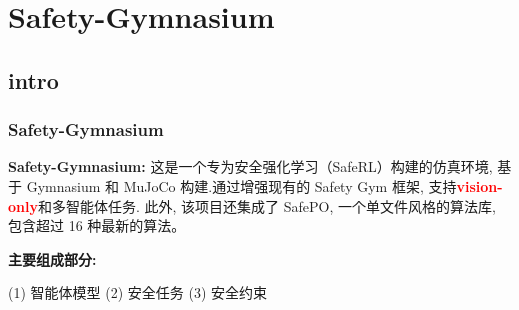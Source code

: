 \documentclass[10pt,mathserif]{beamer}%
\begin{document}
\section{Safety-Gymnasium}

\subsection{intro}

\begin{frame}[t, fragile]
\frametitle{Safety-Gymnasium}

\begin{minipage}[t]{\textwidth}
   \textbf{Safety-Gymnasium:} 这是一个专为安全强化学习（SafeRL）构建的仿真环境, 基于 Gymnasium 和 MuJoCo 构建.通过增强现有的 Safety Gym 框架, 支持\textbf{\textcolor{red}{vision-only}}和多智能体任务. 此外, 该项目还集成了 SafePO, 一个单文件风格的算法库, 包含超过 16 种最新的算法。
   
   \vspace{0.3cm}
   
   \textbf{主要组成部分:}

   
   \vspace{0.2cm}
   \hspace*{0.2cm} 
   (1) 智能体模型 \hspace*{1cm} 
   (2) 安全任务 \hspace*{1cm} 
   (3) 安全约束
   \hfill
\end{minipage}


\vfill
\begin{minipage}[bp]{\textwidth}


\end{minipage}
\end{frame}
\end{document}
